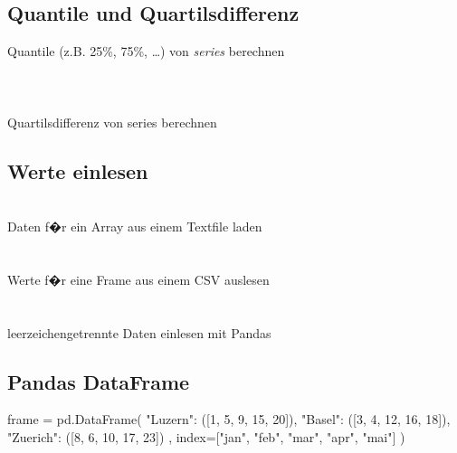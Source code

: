 \documentclass{article}
\begin{document}
\begin{multicols*}{3}
\subsection*{Quantile und Quartilsdifferenz}
Quantile (z.B. 25\%, 75\%, \dots) von \textit{series} berechnen \\

\\
 \\
 \\
Quartilsdifferenz von series berechnen

\subsection*{Werte einlesen}
 \\
Daten f�r ein Array aus einem Textfile laden \\

 \\
 \\
Werte f�r eine Frame aus einem CSV auslesen \\

 \\
 \\
leerzeichengetrennte Daten einlesen mit Pandas

\subsection*{Pandas DataFrame}
\begin{python}
frame = pd.DataFrame({
  "Luzern": ([1, 5, 9, 15, 20]),
  "Basel": ([3, 4, 12, 16, 18]),
  "Zuerich": ([8, 6, 10, 17, 23])
  }, index=["jan", "feb", "mar", "apr", "mai"]
)
\end{python}


\end{multicols*}
\end{document}
